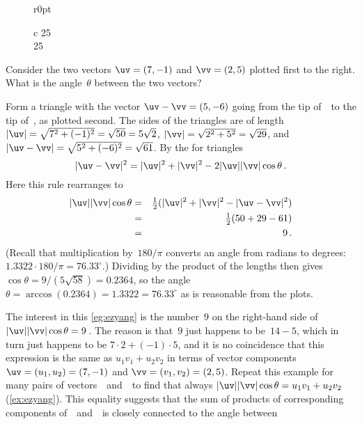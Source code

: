 {%
\def\vecopsHook{\node[above] at (axis cs:0,0) {$\qquad\theta$};}
\begin{wrapfigure}r{0pt}\begin{tabular}c
25\\25
\end{tabular}\end{wrapfigure}
\begin{example} \label{eg:ezyang}
Consider the two vectors \(\uv=(7,-1)\) and \(\vv=(2,5)\) plotted first to the right.
What is the angle~\(\theta\) between the two vectors?
\begin{solution} 
Form a triangle with the vector \(\uv-\vv=(5,-6)\) going from the tip of~\vv\ to the tip of~\uv, as plotted second.
The sides of the triangles are of length \(|\uv|=\sqrt{7^2+(-1)^2}=\sqrt{50}=5\sqrt2\), \(|\vv|=\sqrt{2^2+5^2}=\sqrt{29}\), and \(|\uv-\vv|=\sqrt{5^2+(-6)^2}=\sqrt{61}\).
By the  for triangles
\begin{equation*}
|\uv-\vv|^2=|\uv|^2+|\vv|^2-2|\uv||\vv|\cos\theta \,.
\end{equation*}
Here this rule rearranges to
\begin{eqnarray*}
|\uv||\vv|\cos\theta
&=&\tfrac12(|\uv|^2+|\vv|^2-|\uv-\vv|^2)
\\&=&\tfrac12(50+29-61)
\\&=&9\,.
\end{eqnarray*}
(Recall that multiplication by~\(180/\pi\) converts an angle from radians to degrees: \(1.3322\cdot180/\pi=76.33^\circ\).)
Dividing by the product of the lengths then gives \(\cos\theta=9/(5\sqrt{58})=0.2364\), 
so the angle \(\theta =\arccos(0.2364) =1.3322 =76.33^\circ\) as is reasonable from the plots.
\end{solution}
\end{example}

The interest in this \cref{eg:ezyang} is the number~\(9\) on the right-hand side of \(|\uv||\vv|\cos\theta=9\)\,.  
The reason is that~\(9\) just happens to be~\(14-5\), which in turn just happens to be \(7\cdot2+(-1)\cdot5\), and it is no coincidence that this expression is the same as \(u_1v_1+u_2v_2\) in terms of vector components \(\uv=(u_1,u_2)=(7,-1)\) and \(\vv=(v_1,v_2)=(2,5)\).
Repeat this example for many pairs of vectors~\uv\ and~\vv\ to find that always \(|\uv||\vv|\cos\theta=u_1v_1+u_2v_2\) (\cref{ex:ezyang}).
This equality suggests that the sum of products of corresponding components of~\uv\ and~\vv\ is closely connected to the angle between 
}%


